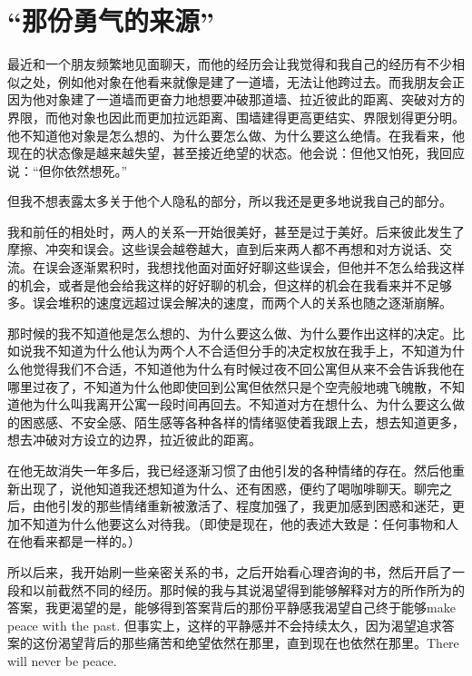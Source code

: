\chapter{“那份勇气的来源”}





最近和一个朋友频繁地见面聊天，而他的经历会让我觉得和我自己的经历有不少相似之处，例如他对象在他看来就像是建了一道墙，无法让他跨过去。而我朋友会正因为他对象建了一道墙而更奋力地想要冲破那道墙、拉近彼此的距离、突破对方的界限，而他对象也因此而更加拉远距离、围墙建得更高更结实、界限划得更分明。他不知道他对象是怎么想的、为什么要怎么做、为什么要这么绝情。在我看来，他现在的状态像是越来越失望，甚至接近绝望的状态。他会说：但他又怕死，我回应说：“但你依然想死。”

但我不想表露太多关于他个人隐私的部分，所以我还是更多地说我自己的部分。

我和前任的相处时，两人的关系一开始很美好，甚至是过于美好。后来彼此发生了摩擦、冲突和误会。这些误会越卷越大，直到后来两人都不再想和对方说话、交流。在误会逐渐累积时，我想找他面对面好好聊这些误会，但他并不怎么给我这样的机会，或者是他会给我这样的好好聊的机会，但这样的机会在我看来并不足够多。误会堆积的速度远超过误会解决的速度，而两个人的关系也随之逐渐崩解。

那时候的我不知道他是怎么想的、为什么要这么做、为什么要作出这样的决定。比如说我不知道为什么他认为两个人不合适但分手的决定权放在我手上，不知道为什么他觉得我们不合适，不知道他为什么有时候过夜不回公寓但从来不会告诉我他在哪里过夜了，不知道为什么他即使回到公寓但依然只是个空壳般地魂飞魄散，不知道他为什么叫我离开公寓一段时间再回去。不知道对方在想什么、为什么要这么做的困惑感、不安全感、陌生感等各种各样的情绪驱使着我跟上去，想去知道更多，想去冲破对方设立的边界，拉近彼此的距离。

在他无故消失一年多后，我已经逐渐习惯了由他引发的各种情绪的存在。然后他重新出现了，说他知道我还想知道为什么、还有困惑，便约了喝咖啡聊天。聊完之后，由他引发的那些情绪重新被激活了、程度加强了，我更加感到困惑和迷茫，更加不知道为什么他要这么对待我。（即使是现在，他的表述大致是：任何事物和人在他看来都是一样的。）

所以后来，我开始刷一些亲密关系的书，之后开始看心理咨询的书，然后开启了一段和以前截然不同的经历。那时候的我与其说渴望得到能够解释对方的所作所为的答案，我更渴望的是，能够得到答案背后的那份平静感\pozhehao{}我渴望自己终于能够make peace with the past. 但事实上，这样的平静感并不会持续太久，因为渴望追求答案的这份渴望背后的那些痛苦和绝望依然在那里，直到现在也依然在那里。There will never be peace.

